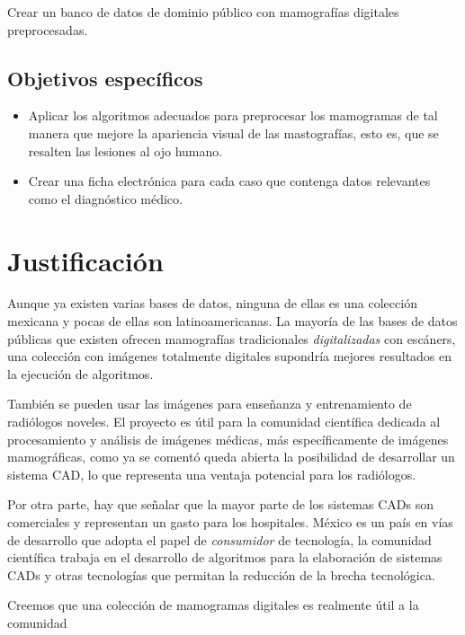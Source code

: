 Crear un banco de datos de dominio público con mamografías digitales
preprocesadas.

\subsection{Objetivos específicos}

\begin{itemize}
    \item Aplicar los algoritmos adecuados para preprocesar los mamogramas de
    tal manera que mejore la apariencia visual de las mastografías, esto es, que
    se resalten las lesiones al ojo humano.
    \item Crear una ficha electrónica para cada caso que contenga datos
    relevantes como el diagnóstico médico.
\end{itemize}

\section{Justificación}

Aunque ya existen varias bases de datos, ninguna de ellas es una colección
mexicana y pocas de ellas son latinoamericanas. La mayoría de las bases de
datos públicas que existen ofrecen mamografías tradicionales
\textit{digitalizadas} con escáners, una colección con imágenes totalmente
digitales supondría mejores resultados en la ejecución de algoritmos.

También se pueden usar las imágenes para enseñanza y entrenamiento de
radiólogos noveles. El proyecto es útil para la comunidad científica dedicada
al procesamiento y análisis de imágenes médicas, más específicamente de
imágenes mamográficas, como ya se comentó queda abierta la posibilidad de
desarrollar un sistema CAD, lo que representa una ventaja potencial para los
radiólogos.

Por otra parte, hay que señalar que la mayor parte de los sistemas CADs son
comerciales y representan un gasto para los hospitales. México es un país en
vías de desarrollo que adopta el papel de \textit{consumidor} de tecnología, la
comunidad científica trabaja en el desarrollo de algoritmos para la elaboración
de sistemas CADs y otras tecnologías que permitan la reducción de la brecha
tecnológica.

Creemos que una colección de mamogramas digitales es realmente útil a la
comunidad

